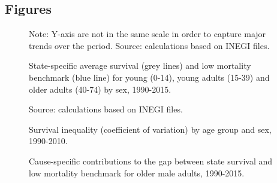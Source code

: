 \documentclass{bmcart}
\begin{document}
\begin{backmatter}




\section*{Figures}

\begin{figure}[h!]
\centering
\caption{State-specific average survival (grey lines) and low mortality benchmark (blue line) for young (0-14), young adults (15-39) and older adults (40-74) by sex, 1990-2015.}
\label{Fig1}


Note: Y-axis are not in the same scale in order to capture major trends over the period. Source: calculations based on INEGI files. 
\end{figure}



\begin{figure}[h!]
\centering
\caption{Survival inequality (coefficient of variation) by age group and sex, 1990-2010.}
\label{Fig2}

Source: calculations based on INEGI files. 
\end{figure}



\begin{figure}[h!]
\centering
\caption{Cause-specific contributions to the gap between state survival and low mortality benchmark for older male adults, 1990-2015.}
\label{Fig3}


\end{figure}
\end{backmatter}
\end{document}
